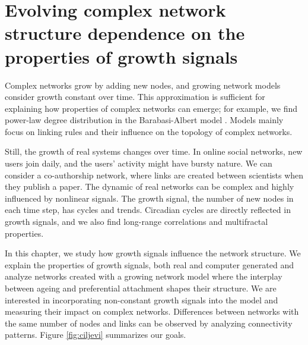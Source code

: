
\chapter{Evolving complex network structure dependence on the properties of growth signals} %
\label{Ch:signals} %

Complex networks grow by adding new nodes, and growing network models consider growth constant over time. This approximation is sufficient for explaining how properties of complex networks can emerge; for example, 
we find power-law %
degree distribution in the Barabasi-Albert model \cite{barabasi1999}. %
Models mainly focus on linking rules and their influence on the topology of complex networks. 

Still, the growth of real systems changes over time. In online social networks, new users join daily, and the users' activity might have bursty nature. We can consider a co-authorship network, where links are created between scientists when they publish a paper. %
The dynamic of real networks can be complex and highly influenced by nonlinear signals. The growth signal, the number of new nodes in each time step, has cycles and trends. Circadian cycles are directly reflected in growth signals, and we also find long-range correlations and multifractal properties. %

In this chapter, we study how growth signals influence the network structure. We explain the properties of growth signals, both real and computer generated and
analyze networks created with a growing network model where the interplay between ageing and preferential attachment shapes their structure. We are interested in incorporating non-constant growth signals into the model and measuring their impact on complex networks. Differences between networks with the same number of nodes and links can be observed by analyzing connectivity patterns. Figure \ref{fig:ciljevi} summarizes our goals. 
 

